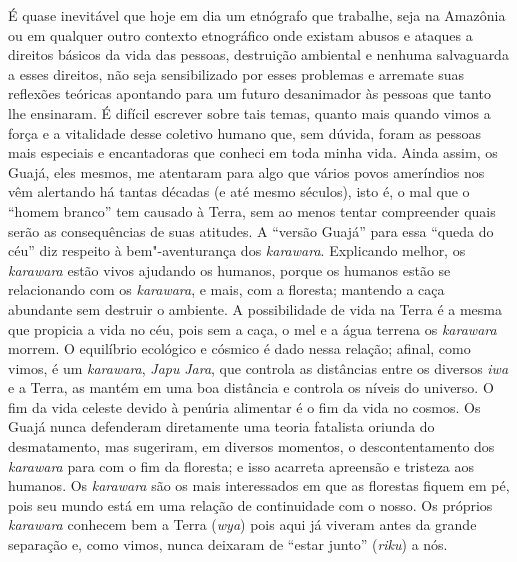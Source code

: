 É quase inevitável que hoje em dia um etnógrafo que trabalhe, seja na
Amazônia ou em qualquer outro contexto etnográfico onde existam abusos e
ataques a direitos básicos da vida das pessoas, destruição ambiental e
nenhuma salvaguarda a esses direitos, não seja sensibilizado por esses
problemas e arremate suas reflexões teóricas apontando para um futuro
desanimador às pessoas que tanto lhe ensinaram. É difícil escrever sobre
tais temas, quanto mais quando vimos a força e a vitalidade desse
coletivo humano que, sem dúvida, foram as pessoas mais especiais e
encantadoras que conheci em toda minha vida. Ainda assim, os Guajá, eles
mesmos, me atentaram para algo que vários povos ameríndios nos vêm
alertando há tantas décadas (e até mesmo séculos), isto é, o mal que o
``homem branco'' tem causado à Terra, sem ao menos tentar compreender
quais serão as consequências de suas atitudes. A ``versão Guajá'' para
essa ``queda do céu'' diz respeito à bem"-aventurança dos \emph{karawara}.
Explicando melhor, os \emph{karawara} estão vivos ajudando os humanos,
porque os humanos estão se relacionando com os \emph{karawara}, e mais,
com a floresta; mantendo a caça abundante sem destruir o ambiente. A
possibilidade de vida na Terra é a mesma que propicia a vida no céu,
pois sem a caça, o mel e a água terrena os \emph{karawara} morrem. O
equilíbrio ecológico e cósmico é dado nessa relação; afinal, como vimos,
é um \emph{karawara}, \emph{Japu} \emph{Jara}, que controla as
distâncias entre os diversos \emph{iwa} e a Terra, as mantém em uma boa
distância e controla os níveis do universo. O fim da vida celeste devido
à penúria alimentar é o fim da vida no cosmos. Os Guajá nunca defenderam
diretamente uma teoria fatalista oriunda do desmatamento, mas sugeriram,
em diversos momentos, o descontentamento dos \emph{karawara} para com o
fim da floresta; e isso acarreta apreensão e tristeza aos humanos. Os
\emph{karawara} são os mais interessados em que as florestas fiquem em
pé, pois seu mundo está em uma relação de continuidade com o nosso. Os
próprios \emph{karawara} conhecem bem a Terra (\emph{wya}) pois aqui já
viveram antes da grande separação e, como vimos, nunca deixaram de
``estar junto'' (\emph{riku}) a nós.

